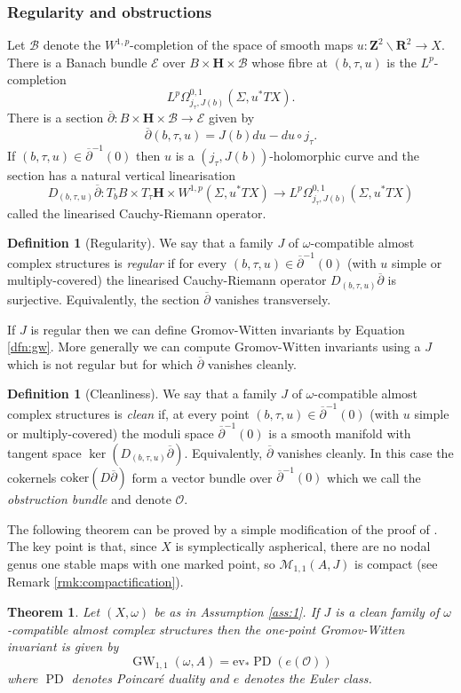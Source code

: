 \documentclass[11pt]{amsart}
\newcommand{\mB}{\mathcal{B}}
\newcommand{\mE}{\mathcal{E}}
\newcommand{\mM}{\mathcal{M}}
\newcommand{\HH}{\mathbf{H}}
\newcommand{\RR}{\mathbf{R}}
\newcommand{\ZZ}{\mathbf{Z}}
\newcommand{\ev}{\mathrm{ev}}
\newcommand{\Obs}{\mathcal{O}}
\newcommand{\dbar}{\overline{\partial}}
\newcommand{\coker}{\mathrm{coker}}
\newcommand{\GW}{\operatorname{GW}}
\newcommand{\torus}{\ZZ^2\backslash\RR^2}
\newcommand{\OP}{\operatorname}
\numberwithin{equation}{section}
\newtheorem{thm}[equation]{Theorem}
\theoremstyle{definition}
\newtheorem{dfn}[equation]{Definition}
\theoremstyle{remark}
\begin{document}
\subsubsection{Regularity and obstructions}\label{sct:regul}
Let $\mB$ denote the $W^{1,p}$-completion of the space of smooth maps $u\colon\torus\to X$. There is a Banach bundle $\mE$ over $B\times\HH\times\mB$ whose fibre at $(b,\tau,u)$ is the $L^p$-completion
\[L^p\Omega^{0,1}_{j_{\tau},J(b)}(\Sigma,u^*TX).\]
There is a section $\dbar\colon B\times\HH\times\mB\to\mE$ given by
\[\dbar(b,\tau,u)=J(b)du-du\circ j_{\tau}.\]
If $(b,\tau,u)\in\dbar^{-1}(0)$ then $u$ is a $(j_{\tau},J(b))$-holomorphic curve and the section has a natural vertical linearisation
\[D_{(b,\tau,u)}\dbar\colon T_bB\times T_{\tau}\HH\times W^{1,p}(\Sigma,u^*TX)\to L^p\Omega^{0,1}_{j_{\tau},J(b)}(\Sigma,u^*TX)\]
called the linearised Cauchy-Riemann operator.
\begin{dfn}[Regularity]\label{dfn:regul}
We say that a family $J$ of $\omega$-compatible almost complex structures is \emph{regular} if for every $(b,\tau,u)\in\dbar^{-1}(0)$ (with $u$ simple or multiply-covered) the linearised Cauchy-Riemann operator $D_{(b,\tau,u)}\dbar$ is surjective. Equivalently, the section $\dbar$ vanishes transversely.
\end{dfn}
If $J$ is regular then we can define Gromov-Witten invariants by Equation \eqref{dfn:gw}. More generally we can compute Gromov-Witten invariants using a $J$ which is not regular but for which $\dbar$ vanishes cleanly.
\begin{dfn}[Cleanliness]\label{clean}
We say that a family $J$ of $\omega$-compatible almost complex structures is \emph{clean} if, at every point $(b,\tau,u)\in\dbar^{-1}(0)$ (with $u$ simple or multiply-covered) the moduli space $\dbar^{-1}(0)$ is a smooth manifold with tangent space $\ker(D_{(b,\tau,u)}\dbar)$. Equivalently, $\dbar$ vanishes cleanly. In this case the cokernels $\coker(D\dbar)$ form a vector bundle over $\dbar^{-1}(0)$ which we call the \emph{obstruction bundle} and denote $\Obs$.
\end{dfn}
The following theorem can be proved by a simple modification of the proof of {\cite[Proposition 7.2.3]{MS04}}. The key point is that, since $X$ is symplectically aspherical, there are no nodal genus one stable maps with one marked point, so $\mM_{1,1}(A,J)$ is compact (see Remark \ref{rmk:compactification}).
\begin{thm}
Let $(X,\omega)$ be as in Assumption \ref{ass:1}. If $J$ is a clean family of $\omega$-compatible almost complex structures then the one-point Gromov-Witten invariant is given by
\[\GW_{1,1}(\omega,A)=\ev_*\OP{PD}(e(\Obs))\]
where $\OP{PD}$ denotes Poincar\'{e} duality and $e$ denotes the Euler class.
\end{thm}
\end{document}
